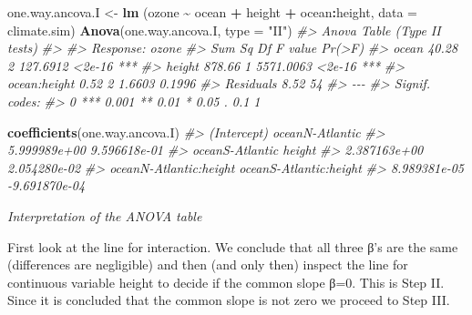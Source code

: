 \documentclass[
]{book}
\newenvironment{Shaded}{\begin{snugshade}}{\end{snugshade}}
\newcommand{\AttributeTok}[1]{\textcolor[rgb]{0.13,0.29,0.53}{#1}}
\newcommand{\CommentTok}[1]{\textcolor[rgb]{0.56,0.35,0.01}{\textit{#1}}}
\newcommand{\FunctionTok}[1]{\textcolor[rgb]{0.13,0.29,0.53}{\textbf{#1}}}
\newcommand{\NormalTok}[1]{#1}
\newcommand{\OtherTok}[1]{\textcolor[rgb]{0.56,0.35,0.01}{#1}}
\newcommand{\SpecialCharTok}[1]{\textcolor[rgb]{0.81,0.36,0.00}{\textbf{#1}}}
\newcommand{\StringTok}[1]{\textcolor[rgb]{0.31,0.60,0.02}{#1}}
\begin{document}
\begin{Shaded}
\begin{Highlighting}[]
\NormalTok{one.way.ancova.I }\OtherTok{\textless{}{-}} \FunctionTok{lm}\NormalTok{ (ozone }\SpecialCharTok{\textasciitilde{}}\NormalTok{ ocean }\SpecialCharTok{+}\NormalTok{ height }\SpecialCharTok{+}\NormalTok{ ocean}\SpecialCharTok{:}\NormalTok{height, }
                        \AttributeTok{data =}\NormalTok{ climate.sim)}
\FunctionTok{Anova}\NormalTok{(one.way.ancova.I, }\AttributeTok{type =} \StringTok{"II"}\NormalTok{)}
\CommentTok{\#\textgreater{} Anova Table (Type II tests)}
\CommentTok{\#\textgreater{} }
\CommentTok{\#\textgreater{} Response: ozone}
\CommentTok{\#\textgreater{}              Sum Sq Df   F value Pr(\textgreater{}F)    }
\CommentTok{\#\textgreater{} ocean         40.28  2  127.6912 \textless{}2e{-}16 ***}
\CommentTok{\#\textgreater{} height       878.66  1 5571.0063 \textless{}2e{-}16 ***}
\CommentTok{\#\textgreater{} ocean:height   0.52  2    1.6603 0.1996    }
\CommentTok{\#\textgreater{} Residuals      8.52 54                     }
\CommentTok{\#\textgreater{} {-}{-}{-}}
\CommentTok{\#\textgreater{} Signif. codes:  }
\CommentTok{\#\textgreater{} 0 \textquotesingle{}***\textquotesingle{} 0.001 \textquotesingle{}**\textquotesingle{} 0.01 \textquotesingle{}*\textquotesingle{} 0.05 \textquotesingle{}.\textquotesingle{} 0.1 \textquotesingle{} \textquotesingle{} 1}

\FunctionTok{coefficients}\NormalTok{(one.way.ancova.I)}
\CommentTok{\#\textgreater{}            (Intercept)        oceanN{-}Atlantic }
\CommentTok{\#\textgreater{}           5.999989e+00           9.596618e{-}01 }
\CommentTok{\#\textgreater{}        oceanS{-}Atlantic                 height }
\CommentTok{\#\textgreater{}           2.387163e+00           2.054280e{-}02 }
\CommentTok{\#\textgreater{} oceanN{-}Atlantic:height oceanS{-}Atlantic:height }
\CommentTok{\#\textgreater{}           8.989381e{-}05          {-}9.691870e{-}04}
\end{Highlighting}
\end{Shaded}

\emph{Interpretation of the ANOVA table}

First look at the line for interaction. We conclude that all three β's are the same (differences are negligible) and then (and only then) inspect the line for continuous variable height to decide if the common slope β=0. This is Step II. Since it is concluded that the common slope is not zero we proceed to Step III.
\end{document}
